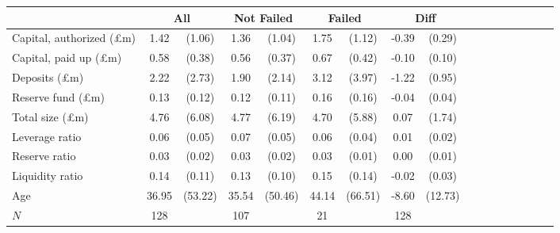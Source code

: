 {
\def\sym#1{\ifmmode^{#1}\else\(^{#1}\)\fi}
\begin{tabular}{l*{4}{cccc}}
\toprule
          &\multicolumn{2}{c}{All}&\multicolumn{2}{c}{Not Failed}&\multicolumn{2}{c}{Failed}&\multicolumn{2}{c}{Diff}\\
\midrule
Capital, authorized (\pounds m)&     1.42&   (1.06)&     1.36&   (1.04)&     1.75&   (1.12)&    -0.39&   (0.29)   \\
Capital, paid up (\pounds m)&     0.58&   (0.38)&     0.56&   (0.37)&     0.67&   (0.42)&    -0.10&   (0.10)   \\
Deposits (\pounds m)&     2.22&   (2.73)&     1.90&   (2.14)&     3.12&   (3.97)&    -1.22&   (0.95)   \\
Reserve fund (\pounds m)&     0.13&   (0.12)&     0.12&   (0.11)&     0.16&   (0.16)&    -0.04&   (0.04)   \\
Total size (\pounds m)&     4.76&   (6.08)&     4.77&   (6.19)&     4.70&   (5.88)&     0.07&   (1.74)   \\
Leverage ratio&     0.06&   (0.05)&     0.07&   (0.05)&     0.06&   (0.04)&     0.01&   (0.02)   \\
Reserve ratio&     0.03&   (0.02)&     0.03&   (0.02)&     0.03&   (0.01)&     0.00&   (0.01)   \\
Liquidity ratio&     0.14&   (0.11)&     0.13&   (0.10)&     0.15&   (0.14)&    -0.02&   (0.03)   \\
Age       &    36.95&  (53.22)&    35.54&  (50.46)&    44.14&  (66.51)&    -8.60&  (12.73)   \\
\midrule
\(N\)     &      128&         &      107&         &       21&         &      128&            \\
\bottomrule
\end{tabular}
}
